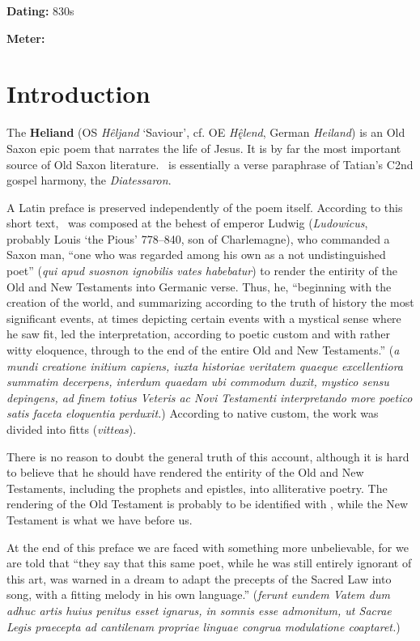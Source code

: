 \def\thisBookCode{Heliand}

\begin{flushright}%
\textbf{Dating:} 830s

\textbf{Meter:} \Fornyrdislag%
\end{flushright}%

\section{Introduction}

The \textbf{Heliand} (OS \emph{Hêljand} ‘Saviour’, cf. OE \emph{Hę̂lend}, German \emph{Heiland}) is an Old Saxon epic poem that narrates the life of Jesus.  It is by far the most important source of Old Saxon literature.  \Heliand\ is essentially a verse paraphrase of Tatian’s C2nd gospel harmony, the \emph{Diatessaron}.

A Latin preface is preserved independently of the poem itself.  According to this short text, \Heliand\ was composed at the behest of emperor Ludwig (\emph{Ludowicus}, probably Louis ‘the Pious’ 778–840, son of Charlemagne), who commanded a Saxon man, “one who was regarded among his own as a not undistinguished poet” (\emph{qui apud suosnon ignobilis vates habebatur}) to render the entirity of the Old and New Testaments into Germanic verse.  Thus, he, “beginning with the creation of the world, and summarizing according to the truth of history the most significant events, at times depicting certain events with a mystical sense where he saw fit, led the interpretation, according to poetic custom and with rather witty eloquence, through to the end of the entire Old and New Testaments.” (\emph{a mundi creatione initium capiens, iuxta historiae veritatem quaeque excellentiora summatim decerpens, interdum quaedam ubi commodum duxit, mystico sensu depingens, ad finem totius Veteris ac Novi Testamenti interpretando more poetico satis faceta eloquentia perduxit.})  According to native custom, the work was divided into fitts (\emph{vitteas}).

There is no reason to doubt the general truth of this account, although it is hard to believe that he should have rendered the entirity of the Old and New Testaments, including the prophets and epistles, into alliterative poetry.  The rendering of the Old Testament is probably to be identified with \SaxonGenesis, while the New Testament is what we have before us.

At the end of this preface we are faced with something more unbelievable, for we are told that “they say that this same poet, while he was still entirely ignorant of this art, was warned in a dream to adapt the precepts of the Sacred Law into song, with a fitting melody in his own language.” (\emph{ferunt eundem Vatem dum adhuc artis huius penitus esset ignarus, in somnis esse admonitum, ut Sacrae Legis praecepta ad cantilenam propriae linguae congrua modulatione coaptaret.})

